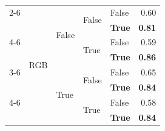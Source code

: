 \begin{tabular}{@{}lllllr@{}}
    \cmidrule{2-6}                                                                                                                                                             
                                                        & \multirow[c]{9}{*}{RGB}           & \multirow[c]{4}{*}{False} & \multirow[c]{2}{*}{False} & False                 & 0.60 \\
                                                        &                                   &                           &                           & \textbf{True}         & \textbf{0.81} \\
    \cmidrule{4-6}                                                                                                                                                             
                                                        &                                   &                           & \multirow[c]{2}{*}{True}  & False                 & 0.59 \\
                                                        &                                   &                           &                           & \textbf{True}         & \textbf{0.86} \\
    \cmidrule{3-6}                                                                                                                                                             
                                                        &                                   & \multirow[c]{4}{*}{True}  & \multirow[c]{2}{*}{False} & False                 & 0.65 \\
                                                        &                                   &                           &                           & \textbf{True}         & \textbf{0.84} \\
    \cmidrule{4-6}                                                                                                                                                             
                                                        &                                   &                           & \multirow[c]{2}{*}{True}  & False                 & 0.58 \\
                                                        &                                   &                           &                           & \textbf{True}         & \textbf{0.84} \\
    \bottomrule
\end{tabular}
